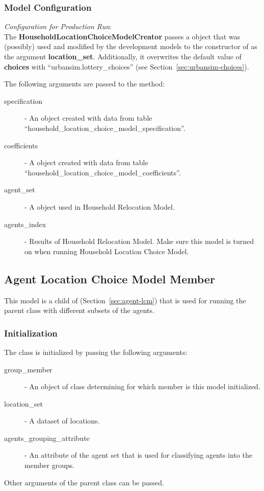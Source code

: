 \subsubsection{Model Configuration}
\modelsindex
%
{\em Configuration for Production Run}:\\[1mm]
The {\bf HouseholdLocationChoiceModelCreator} passes a
 object that was (possibly) used and modified by the
development models \modelsindex to the constructor of  \modelsindex as
the argument {\bf location_set}. Additionally, it overwrites the default
value of {\bf choices} with ``urbansim.lottery_choices'' (see
Section~\ref{sec:urbansim-choices}).

The following arguments are passed to
  the  method:
\begin{description}
\item[specification] - An  object created with
  data from table ``household_location_choice_model_specification''. \modelsindex
\item[coefficients] \coefficientsindex - A  \coefficientsindex object created with data from
  table ``household_location_choice_model_coefficients''. \modelsindex
\item[agent_set] - A  object used in Household Relocation
  Model. \modelsindex
\item[agents_index] - Results of Household Relocation Model. \modelsindex Make sure this model is turned on 
when running Household Location Choice Model.
\end{description}


\subsection{Agent Location Choice Model Member}
%
\modelsindex
\label{sec:agent-lcm-member}
%
This model is a child of  (Section~\ref{sec:agent-lcm}) that is used 
for running the parent class with different subsets of the agents.

\subsubsection{Initialization}
%
The class is initialized by passing the following arguments:
\begin{description}
\item[group_member] - An object of class  determining for which member is this model initialized.
\item[location_set] - A dataset of locations.
\item[agents_grouping_attribute] - An attribute of the agent set that is used for classifying agents into the member groups. 
\end{description}
Other arguments of the parent class can be passed. 

